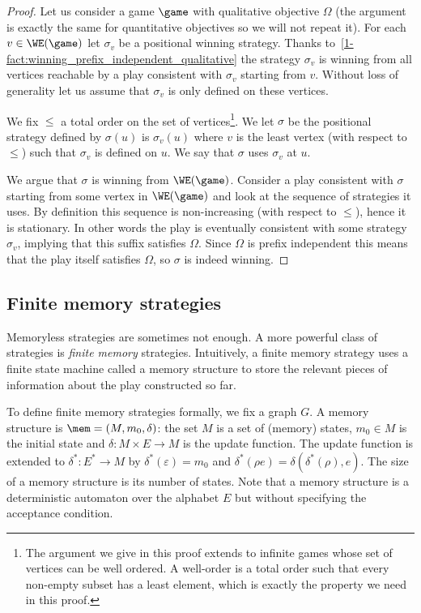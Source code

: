 \begin{proof}
Let us consider a game $\game$ with qualitative objective $\Omega$ (the argument is exactly the same for quantitative objectives so we will not repeat it).
For each $v \in \WE(\game)$ let $\sigma_v$ be a positional winning strategy.
Thanks to~\cref{1-fact:winning_prefix_independent_qualitative}
the strategy $\sigma_v$ is winning from all vertices reachable by a play consistent with $\sigma_v$ starting from $v$.
Without loss of generality let us assume that $\sigma_v$ is only defined on these vertices.

We fix $\le$ a total order on the set of vertices\footnote{The argument we give in this proof extends to infinite games whose set of vertices can be well ordered. A well-order is a total order such that every non-empty subset has a least element, which is exactly the property we need in this proof.}.
We let $\sigma$ be the positional strategy defined by $\sigma(u)$ is $\sigma_v(u)$ where $v$ is the least vertex (with respect to $\le$) such that $\sigma_v$ is defined on $u$. We say that $\sigma$ uses $\sigma_v$ at $u$.

We argue that $\sigma$ is winning from $\WE(\game)$. 
Consider a play consistent with $\sigma$ starting from some vertex in $\WE(\game)$ and look at the sequence of strategies it uses.
By definition this sequence is non-increasing (with respect to $\le$), hence it is stationary.
In other words the play is eventually consistent with some strategy $\sigma_v$, implying that this suffix satisfies $\Omega$.
Since $\Omega$ is prefix independent this means that the play itself satisfies $\Omega$, so $\sigma$ is indeed winning.
\end{proof}

\subsection*{Finite memory strategies}
Memoryless strategies are sometimes not enough. 
A more powerful class of strategies is \textit{finite memory} strategies.
Intuitively, a finite memory strategy uses a finite state machine called a memory structure 
to store the relevant pieces of information about the play constructed so far.

To define finite memory strategies formally, we fix a graph $G$.
A memory structure is $\mem = (M, m_0, \delta)$: the set $M$ is a set of (memory) states, 
$m_0 \in M$ is the initial state and $\delta : M \times E \to M$ is the update function.
The update function is extended to $\delta^* : E^* \to M$ by 
$\delta^*(\varepsilon) = m_0$ and $\delta^* (\rho e) = \delta(\delta^*(\rho), e)$.
The size of a memory structure is its number of states.
Note that a memory structure is a deterministic automaton over the alphabet $E$ but without specifying the acceptance condition.

